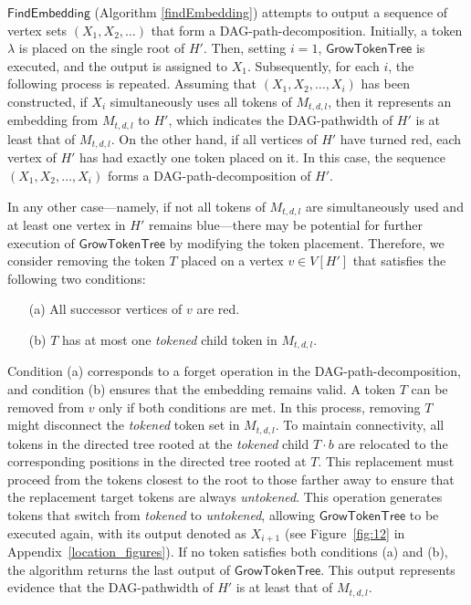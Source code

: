 \documentclass[runningheads]{llncs}
\theoremstyle{plain}
\theoremstyle{definition}
\begin{document}
$\mathsf{FindEmbedding}$ (Algorithm \ref{findEmbedding}) attempts to output a sequence of vertex sets $(X_1, X_2, \dots)$ that form a DAG-path-decomposition. Initially, a token $\lambda$ is placed on the single root of $H'$. Then, setting $i=1$, $\mathsf{GrowTokenTree}$ is executed, and the output is assigned to $X_1$. Subsequently, for each $i$, the following process is repeated. Assuming that $(X_1, X_2, \dots , X_i)$ has been constructed, if $X_i$ simultaneously uses all tokens of $M_{t, d, l}$, then it represents an embedding from $M_{t, d, l}$ to $H'$, which indicates the DAG-pathwidth of $H'$ is at least that of $M_{t, d, l}$. On the other hand, if all vertices of $H'$ have turned red, each vertex of $H'$ has had exactly one token placed on it. In this case, the sequence $(X_1, X_2, \dots, X_i)$ forms a DAG-path-decomposition of $H'$.

In any other case—namely, if not all tokens of $M_{t, d, l}$ are simultaneously used and at least one vertex in $H'$ remains blue—there may be potential for further execution of $\mathsf{GrowTokenTree}$ by modifying the token placement. Therefore, we consider removing the token $T$ placed on a vertex $v \in V[H']$ that satisfies the following two conditions:

\begin{enumerate}
    \item[(a)] All successor vertices of $v$ are red.
    \item[(b)] $T$ has at most one \textit{tokened} child token in $M_{t, d, l}$.
\end{enumerate}

Condition (a) corresponds to a forget operation in the DAG-path-decomposition, and condition (b) ensures that the embedding remains valid. A token $T$ can be removed from $v$ only if both conditions are met. In this process, removing $T$ might disconnect the \textit{tokened} token set in $M_{t, d, l}$. To maintain connectivity, all tokens in the directed tree rooted at the \textit{tokened} child $T \cdot b$ are relocated to the corresponding positions in the directed tree rooted at $T$. This replacement must proceed from the tokens closest to the root to those farther away to ensure that the replacement target tokens are always \textit{untokened}. This operation generates tokens that switch from \textit{tokened} to \textit{untokened}, allowing $\mathsf{GrowTokenTree}$ to be executed again, with its output denoted as $X_{i+1}$ (see Figure~\ref{fig:12} in Appendix~\ref{location_figures}). If no token satisfies both conditions (a) and (b), the algorithm returns the last output of $\mathsf{GrowTokenTree}$. This output represents evidence that the DAG-pathwidth of $H'$ is at least that of $M_{t, d, l}$.
\end{document}

